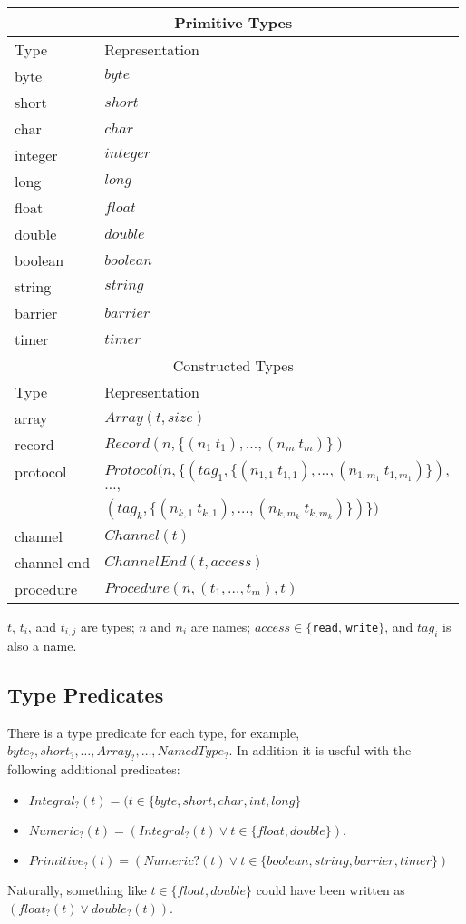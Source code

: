 \documentclass[pdflatex,11pt,letter]{article}
\begin{document}
\begin{center}
\begin{tabular}{|l|l|}\hline
\multicolumn{2}{|c|}{Primitive Types}\\ \hline
Type & Representation \\ \hline\hline
byte		& $byte$\\
short		& $short$\\
char		& $char$\\
integer		& $integer$\\
long		& $long$\\
float		& $float$\\
double		& $double$\\
boolean		& $boolean$\\
string      & $string$\\
barrier		& $barrier$\\
timer       & $timer$\\\hline
\multicolumn{2}{|c|}{Constructed Types}\\ \hline
Type & Representation \\ \hline\hline
array		& $Array(t, size)$\\
record		& $Record(n, \{(n_1\ t_1),\ldots,(n_m\ t_m)\})$\\
protocol    & $Protocol(n, \{(tag_1, \{(n_{1,1}\ t_{1,1}),\ldots,(n_{1,m_1}\ t_{1,m_1})\}),$\\
            & \hspace*{2.35cm}$\ldots,$\\
            & \hspace*{2.25cm}$(tag_k, \{(n_{k,1}\ t_{k,1}),\ldots,(n_{k,m_k}\ t_{k,m_k})\})\})$\\
channel     & $Channel(t)$\\
channel end & $ChannelEnd(t, access)$\\
procedure   & $Procedure(n, (t_1,\ldots,t_m), t)$\\ \hline 
\end{tabular}
\end{center}

\noindent
$t$, $t_i$, and $t_{i,j}$ are types; $n$ and $n_i$ are names; $access \in \{${\tt read}, {\tt write}$\}$, and $tag_i$ is also a name.

\subsection{Type Predicates}

There is a type predicate for each type, for example, $byte_?, short_?, \ldots, Array_?,\ldots,NamedType_?$. In addition it is useful with the following additional predicates:
\begin{itemize}
\item $Integral_?(t) = (t \in \{byte, short, char, int, long\}$
\item $Numeric_?(t) = (Integral_?(t) \vee t \in \{float, double\})$.
\item $Primitive_?(t) = (Numeric?(t) \vee t \in \{boolean, string, barrier, timer\})$
\end{itemize}
Naturally, something like $t \in \{float, double\}$ could have been written as $(float_?(t) \vee double_?(t))$.
\end{document}
